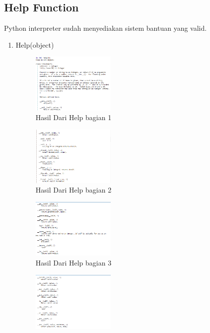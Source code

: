\subsection{Help Function}
\hfill\break
Python interpreter sudah menyediakan sistem bantuan yang valid.
\begin{enumerate}
    \item Help(object)
    
    \begin{figure}[H]
        \includegraphics[width=4cm]{figures/kelompok3/1/1.png}
        \centering
        \caption{Hasil Dari Help bagian 1}
    \end{figure}
    \begin{figure}[H]
        \includegraphics[width=4cm]{figures/kelompok3/1/2.png}
        \centering
        \caption{Hasil Dari Help bagian 2}
    \end{figure}
    \begin{figure}[H]
        \includegraphics[width=4cm]{figures/kelompok3/1/3.png}
        \centering
        \caption{Hasil Dari Help bagian 3}
    \end{figure}
    \begin{figure}[H]
        \includegraphics[width=4cm]{figures/kelompok3/1/4.png}

\end{figure}
\end{enumerate}

